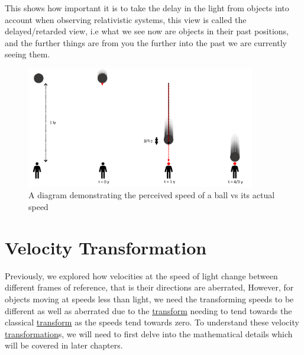 This shows how important it is to take the delay in the light from objects into account when observing relativistic systems, this view is called the delayed/retarded view, i.e what we see now are objects in their past positions, and the further things are from you the further into the past we are currently seeing them.

\begin{figure}[H]
	\centering
	\includegraphics[width=10cm]{images/pdf/Perceived_speed.pdf}
	\caption{A diagram demonstrating the perceived speed of a ball vs its actual speed}
	\label{fig: perceived vs actual speed}
\end{figure}

\section{Velocity Transformation}

Previously, we explored how velocities at the speed of light change between different frames of reference, that is their directions are aberrated, However, for objects moving at speeds less than light, we need the transforming speeds to be different as well as aberrated due to the \hyperlink{def-transform}{transform} needing to tend towards the classical \hyperlink{def-transform}{transform} as the speeds tend towards zero. To understand these velocity \hyperlink{def-transform}{transformation}s, we will need to first delve into the mathematical details which will be covered in later chapters.



